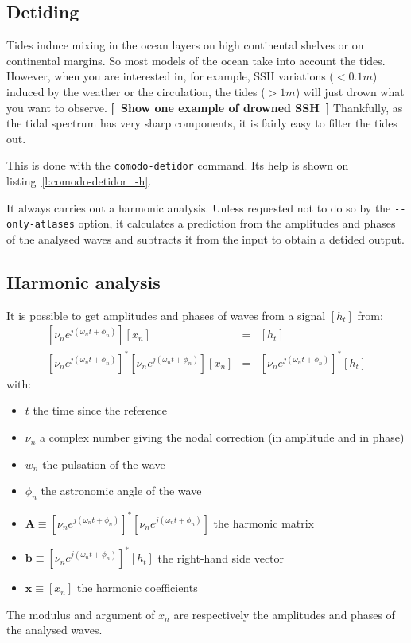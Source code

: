 \documentclass[11pt]{article} %
\providecommand{\m}[1]{\mathbf{#1}}
\providecommand{\code}[1]{\hbox{\lstinline|#1|}}
\providecommand{\cmdhelp}[1]{\end{multicols}\begin{multicols}{2}}
\newcommand{\lref}[1]{listing~\ref{#1}}
\providecommand{\mynote}[1]{{\color[rgb]{1,.4,0}\sffamily\bfseries[~#1~]}}%
\providecommand{\mynote}[1]{}%
\begin{document}
\begin{multicols}{2}
\section{Detiding}

Tides induce mixing in the ocean layers on high continental shelves or on continental margins.
So most models of the ocean take into account the tides.
However, when you are interested in, for example, \ac{SSH} variations ($<0.1m$) induced by the weather or the circulation, the tides ($>1m$) will just drown what you want to observe.
\mynote{Show one example of drowned SSH}
Thankfully, as the tidal spectrum has very sharp components, it is fairly easy to filter the tides out.

This is done with the \code{comodo-detidor} command.
Its help is shown on \lref{l:comodo-detidor_-h}.
\cmdhelp{comodo-detidor}

It always carries out a harmonic analysis.
Unless requested not to do so by the \code{--only-atlases} option,
it calculates a prediction from the amplitudes and phases of the analysed waves and subtracts it from the input to obtain a detided output.

\subsection{Harmonic analysis}\label{s:analysis}

It is possible to get amplitudes and phases of waves from a signal $ \left[ h_t \right] $ from:
\begin{eqnarray}
\left[ \nu_n e^{j\left(\omega_n t + \phi_n\right)} \right] \left[ x_n \right] &=& \left[ h_t \right] \\
\left[ \nu_n e^{j\left(\omega_n t + \phi_n\right)} \right]^* \left[ \nu_n e^{j\left(\omega_n t + \phi_n\right)} \right] \left[ x_n \right] &=& \left[ \nu_n e^{j\left(\omega_n t + \phi_n\right)} \right]^* \left[ h_t \right] \label{e:analysis}
\end{eqnarray}
with:
\begin{itemize}
\item $ t $ the time since the reference
\item $ \nu_n $ a complex number giving the nodal correction (in amplitude and in phase)
\item $ w_n $ the pulsation of the wave
\item $ \phi_n $ the astronomic angle of the wave
\item $ \m{A} \equiv \left[ \nu_n e^{j\left(\omega_n t + \phi_n\right)} \right]^* \left[ \nu_n e^{j\left(\omega_n t + \phi_n\right)} \right] $ the harmonic matrix
\item $ \m{b} \equiv \left[ \nu_n e^{j\left(\omega_n t + \phi_n\right)} \right]^* \left[ h_t \right] $ the right-hand side vector
\item $ \m{x} \equiv \left[ x_n \right] $ the harmonic coefficients
\end{itemize}
The modulus and argument of $ x_n $ are respectively the amplitudes and phases of the analysed waves.


\end{multicols}
\end{document}
